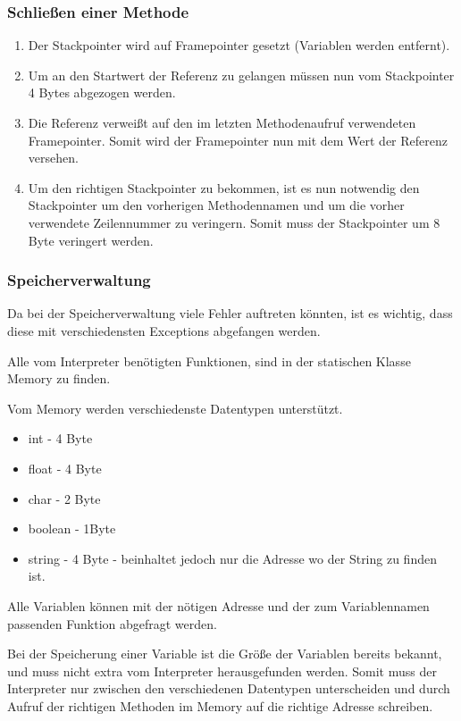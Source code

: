 \subsubsection{Schließen einer Methode}
\begin{enumerate}
 \item Der Stackpointer wird auf Framepointer gesetzt (Variablen werden entfernt).
 \item Um an den Startwert der Referenz zu gelangen müssen nun vom Stackpointer 4 Bytes abgezogen werden.
 \item Die Referenz verweißt auf den im letzten Methodenaufruf verwendeten Framepointer. Somit wird der Framepointer nun mit dem Wert
 der Referenz versehen.
 \item Um den richtigen Stackpointer zu bekommen, ist es nun notwendig den Stackpointer um den vorherigen Methodennamen und um die vorher verwendete Zeilennummer zu veringern.
 Somit muss der Stackpointer um 8 Byte veringert werden.
\end{enumerate}

\subsubsection{Speicherverwaltung}
Da bei der Speicherverwaltung viele Fehler auftreten könnten, ist es wichtig, dass diese mit verschiedensten Exceptions abgefangen werden.

Alle vom Interpreter benötigten Funktionen, sind in der statischen Klasse Memory zu finden. 

Vom Memory werden verschiedenste Datentypen unterstützt.
\begin{itemize}
 \item int - 4 Byte
 \item float - 4 Byte
 \item char - 2 Byte 
 \item boolean - 1Byte
 \item string - 4 Byte - beinhaltet jedoch nur die Adresse wo der String zu finden ist.
\end{itemize}
Alle Variablen können mit der nötigen Adresse und der zum Variablennamen passenden Funktion abgefragt werden.

Bei der Speicherung einer Variable ist die Größe der Variablen bereits bekannt, und muss nicht extra vom Interpreter herausgefunden werden. Somit muss der Interpreter nur zwischen den verschiedenen Datentypen unterscheiden und durch Aufruf der richtigen Methoden im Memory auf die richtige Adresse schreiben.

